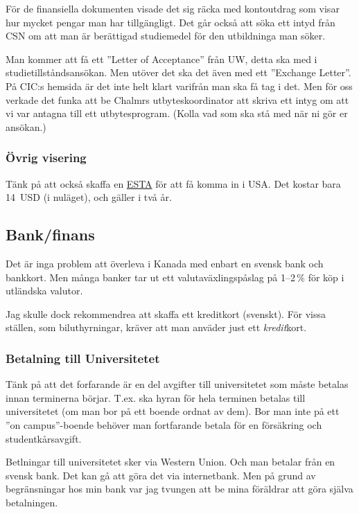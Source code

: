 \documentclass[11pt,a4paper, english, swedish]{article}
\begin{document}
För de finansiella dokumenten visade det sig räcka med kontoutdrag som
visar hur mycket pengar man har tillgängligt. Det går också att söka
ett intyd från CSN om att man är berättigad studiemedel för den
utbildninga man söker. 

Man kommer att få ett ''Letter of Acceptance'' från UW, detta ska med
i studietillståndsansökan. Men utöver det ska det även med ett
''Exchange Letter''. På CIC:s hemsida är det inte helt klart varifrån
man ska få tag i det. Men för oss verkade det funka att be Chalmrs
utbyteskoordinator\footnotemark{} att skriva ett intyg om att vi var
antagna till ett utbytesprogram. (Kolla vad som ska stå med när ni gör
er ansökan.) 

\subsubsection{Övrig visering}
Tänk på att också skaffa en
\href{http://www.esta.us/sweden.html}{ESTA} för att få komma in i
USA. Det kostar bara 14~USD (i nuläget), och gäller i två år.


\subsection{Bank/finans}
Det är inga problem att överleva i Kanada med enbart en svensk bank och
bankkort. Men många banker tar ut ett valutaväxlingspåslag på 1--2\,\%
för köp i utländska valutor. 

Jag skulle dock rekommendrea att skaffa ett kreditkort (svenskt). För
vissa ställen, som biluthyrningar, kräver att man anväder just ett
\emph{kredit}kort. 


\subsubsection{Betalning till Universitetet}
Tänk på att det forfarande är en del avgifter till universitetet som
måste betalas innan terminerna börjar. T.ex. ska hyran för hela terminen
betalas till universitetet (om man bor på ett boende ordnat av
dem). Bor man inte på ett ''on campus''-boende behöver man fortfarande
betala för en försäkring och studentkårsavgift. 

Betlningar till universitetet sker via Western Union. Och man betalar
från en svensk bank. Det kan gå att göra det via internetbank. Men på
grund av begränsningar hos min bank var jag tvungen att be mina
föräldrar att göra själva betalningen. 
\end{document}
